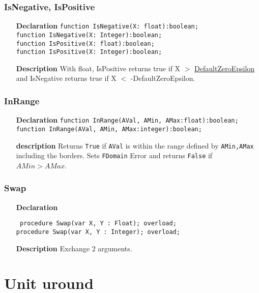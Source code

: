 \documentclass[12pt,a4paper,oneside]{report}
\newcommand{\lmath}[1]{   %
	\marginpar{\vspace{#1} 
		\begin{flushright}
			LMath
	\end{flushright} }
}
\newcommand{\declarationitem}[1]{\textbf{#1}}
\newcommand{\descriptiontitle}[1]{\textbf{#1}}
\newcommand{\code}[1]{\texttt{#1}}
\begin{document}
\subsubsection{IsNegative, IsPositive}
\begin{itemize}
	\item[\declarationitem{Declaration}\hfill]
	\code{function IsNegative(X: float):boolean;\\
	function IsNegative(X: Integer):boolean;\\
	function IsPositive(X: float):boolean;\\
	function IsPositive(X: Integer):boolean;}
	\item[\descriptiontitle{Description}]
	With float, IsPositive returns true if X $>$ \hyperref[utypes-DefaultZeroEpsilon]{DefaultZeroEpsilon} and IsNegative returns true if X $<$ -DefaultZeroEpsilon.
\end{itemize} 
\subsubsection{InRange}
\lmath{-24pt}
\label{uminmax-inrange}
\begin{itemize}
	\item[\declarationitem{Declaration}\hfill]
\code{function InRange(AVal, AMin, AMax:float):boolean;}\\
\code{function InRange(AVal, AMin, AMax:integer):boolean;}
\item[\descriptiontitle{description}]
Returns \code{True} if \code{AVal} is within the range defined by \code{AMin,AMax} including the borders. Sets \code{FDomain} Error and returns \code{False} if $AMin > AMax$.
\end{itemize}
\subsubsection{Swap}\lmath{-24pt}
\label{uminmax-Swap}
\begin{itemize}\item[\declarationitem{Declaration}\hfill]
	\begin{flushleft}
		\code{
			procedure Swap(var X, Y : Float); overload;\\
			procedure Swap(var X, Y : Integer); overload;}
	\end{flushleft}
	\item[\descriptiontitle{Description}]
	Exchange 2 arguments.
\end{itemize}
\section{Unit uround}
\label{uround}
\end{document}
